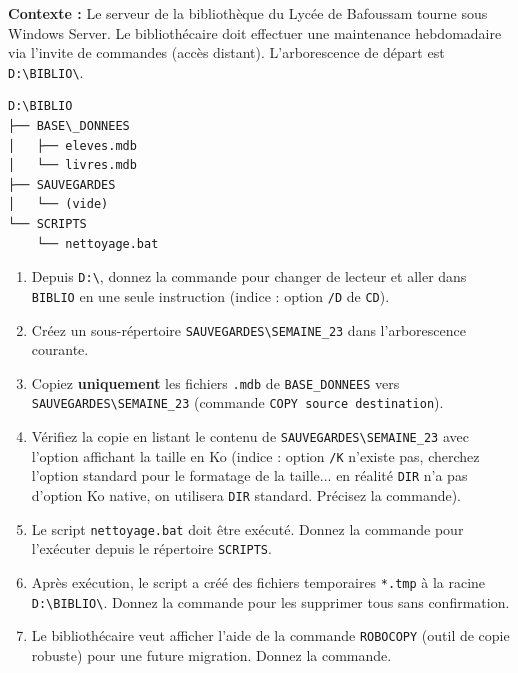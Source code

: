 \documentclass[11pt]{article}
\begin{document}
\begin{exercice}
\textbf{Contexte :} Le serveur de la bibliothèque du Lycée de Bafoussam tourne sous Windows Server. Le bibliothécaire doit effectuer une maintenance hebdomadaire via l'invite de commandes (accès distant). L'arborescence de départ est \texttt{D:\textbackslash BIBLIO\textbackslash}.

\begin{lstlisting}[language=text]
D:\BIBLIO
├── BASE\_DONNEES
│   ├── eleves.mdb
│   └── livres.mdb
├── SAUVEGARDES
│   └── (vide)
└── SCRIPTS
    └── nettoyage.bat
\end{lstlisting}

\begin{enumerate}
    \item Depuis \texttt{D:\textbackslash}, donnez la commande pour changer de lecteur et aller dans \texttt{BIBLIO} en une seule instruction (indice : option \texttt{/D} de \texttt{CD}).
    \item Créez un sous-répertoire \texttt{SAUVEGARDES\textbackslash SEMAINE\_23} dans l'arborescence courante.
    \item Copiez \textbf{uniquement} les fichiers \texttt{.mdb} de \texttt{BASE\_DONNEES} vers \texttt{SAUVEGARDES\textbackslash SEMAINE\_23} (commande \texttt{COPY source destination}).
    \item Vérifiez la copie en listant le contenu de \texttt{SAUVEGARDES\textbackslash SEMAINE\_23} avec l'option affichant la taille en Ko (indice : option \texttt{/K} n'existe pas, cherchez l'option standard pour le formatage de la taille... en réalité \texttt{DIR} n'a pas d'option Ko native, on utilisera \texttt{DIR} standard. Précisez la commande).
    \item Le script \texttt{nettoyage.bat} doit être exécuté. Donnez la commande pour l'exécuter depuis le répertoire \texttt{SCRIPTS}.
    \item Après exécution, le script a créé des fichiers temporaires \texttt{*.tmp} à la racine \texttt{D:\textbackslash BIBLIO\textbackslash}. Donnez la commande pour les supprimer tous sans confirmation.
    \item Le bibliothécaire veut afficher l'aide de la commande \texttt{ROBOCOPY} (outil de copie robuste) pour une future migration. Donnez la commande.
\end{enumerate}
\end{exercice}
\end{document}
